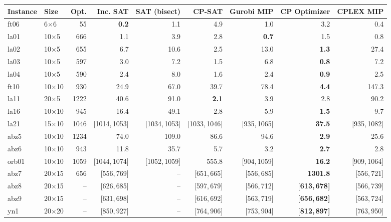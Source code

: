 \begin{tabular}{llrrrrrrr}
\toprule
Instance & Size & Opt. & Inc. SAT & SAT (bisect) & CP-SAT & Gurobi MIP & CP Optimizer & CPLEX MIP \\
\midrule
ft06 & 6$\times$6 & 55 & \textbf{0.2} & 1.1 & 4.9 & 1.0 & 3.2 & 0.4 \\
la01 & 10$\times$5 & 666 & 1.1 & 3.9 & 2.8 & \textbf{0.7} & 1.5 & 0.8 \\
la02 & 10$\times$5 & 655 & 6.7 & 10.6 & 2.5 & 13.0 & \textbf{1.3} & 27.4 \\
la03 & 10$\times$5 & 597 & 3.0 & 7.2 & 1.5 & 6.8 & \textbf{0.8} & 7.2 \\
la04 & 10$\times$5 & 590 & 2.4 & 8.0 & 1.6 & 2.4 & \textbf{0.9} & 2.5 \\
ft10 & 10$\times$10 & 930 & 24.9 & 67.0 & 39.7 & 78.4 & \textbf{4.4} & 147.3 \\
\midrule
la11 & 20$\times$5 & 1222 & 40.6 & 91.0 & \textbf{2.1} & 3.9 & 2.8 & 90.2 \\
la16 & 10$\times$10 & 945 & 16.4 & 49.1 & 2.8 & 5.9 & \textbf{1.5} & 9.7 \\
la21 & 15$\times$10 & 1046 & [1014,\,1053] & [1034,\,1053] & [1033,\,1046] & [935,\,1065] & \textbf{37.5} & [935,\,1082] \\
abz5 & 10$\times$10 & 1234 & 74.0 & 109.0 & 86.6 & 94.6 & \textbf{2.9} & 25.6 \\
abz6 & 10$\times$10 & 943 & 11.8 & 35.7 & 5.7 & 3.2 & \textbf{2.7} & 2.8 \\
orb01 & 10$\times$10 & 1059 & [1044,\,1074] & [1052,\,1059] & 555.8 & [904,\,1059] & \textbf{16.2} & [909,\,1064] \\
\midrule
abz7 & 20$\times$15 & 656 & [556,\,769] & -- & [651,\,665] & [556,\,685] & \textbf{1301.8} & [556,\,721] \\
abz8 & 20$\times$15 & -- & [626,\,685] & -- & [597,\,679] & [566,\,712] & \textbf{[613,\,678]} & [566,\,739] \\
abz9 & 20$\times$15 & -- & [631,\,698] & -- & [616,\,692] & [563,\,719] & \textbf{[656,\,682]} & [563,\,724] \\
yn1 & 20$\times$20 & -- & [850,\,927] & -- & [764,\,906] & [753,\,904] & \textbf{[812,\,897]} & [763,\,950] \\
\bottomrule
\end{tabular}
